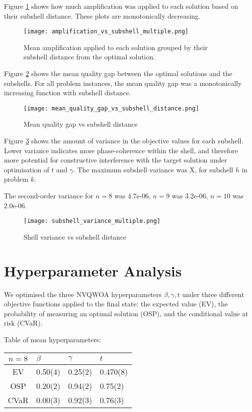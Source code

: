 Figure \ref{fig:amp vs sub} shows how much amplification was applied to each solution based on their subshell distance. These plots are monotonically decreasing. 
\begin{figure}[htbp]
    \centering
    \texttt{[image: amplification\_vs\_subshell\_multiple.png]}
    \caption{Mean amplification applied to each solution grouped by their subshell distance from the optimal solution.}
    \label{fig:amp vs sub}
\end{figure}

Figure \ref{fig:mqg} shows the mean quality gap between the optimal solutions and the subshells. For all problem instances, the mean quality gap was a monotonically increasing function with subshell distance.
\begin{figure}[htbp]
    \centering
    \texttt{[image: mean\_quality\_gap\_vs\_subshell\_distance.png]}
    \caption{Mean quality gap vs subshell distance}
    \label{fig:mqg}
\end{figure}

Figure \ref{fig:shell variance} shows the amount of variance in the objective values for each subshell.
Lower variance indicates more phase-coherence within the shell, and therefore more potential for constructive interference with the target solution under optimisation of $t$ and $\gamma$. The maximum subshell variance was X, for subshell $h$ in problem $k$.

The second-order variance for $n=8$ was 4.7e-06, $n=9$ was 3.2e-06, $n=10$ was 2.0e-06.
\begin{figure}[htbp]
    \centering
    \texttt{[image: subshell\_variance\_multiple.png]}
    \caption{Shell variance vs subshell distance}
    \label{fig:shell variance}
\end{figure}

\section{Hyperparameter Analysis}
We optimised the three NVQWOA hyperparameters $\beta, \gamma, t$ under three different objective functions applied to the final state: the expected value (EV), the probability of measuring an optimal solution (OSP), and the conditional value at risk (CVaR).

Table of mean hyperparameters:

\begin{tabular}{c||l|l|l}
    $n=8$          & $\beta$ & $\gamma$ & $t$     \\\hline\hline
    EV & 0.50(4) & 0.25(2) & 0.470(8) \\\hline
    OSP & 0.20(2) & 0.94(2) & 0.75(2) \\\hline
    CVaR & 0.00(3) & 0.92(3) & 0.76(3) \\\hline
\end{tabular}

